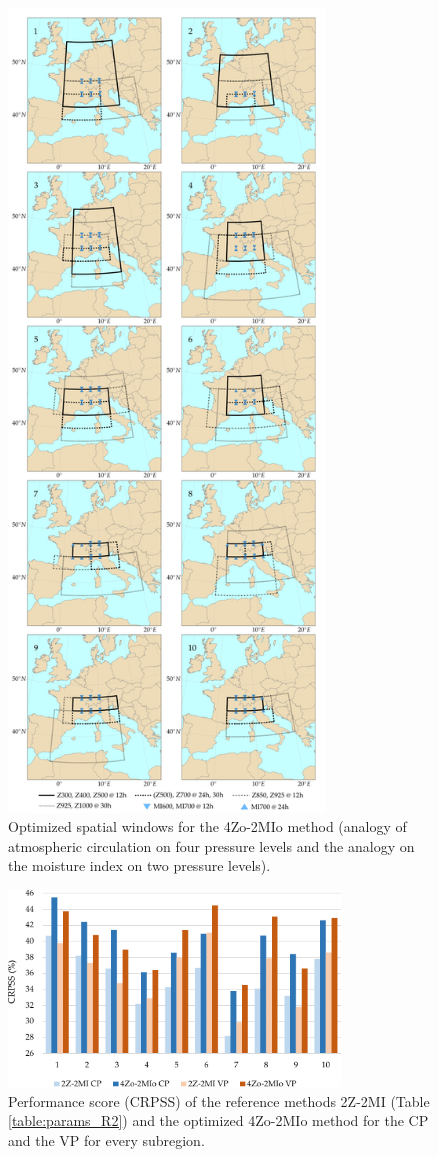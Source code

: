 \documentclass[review]{elsarticle}
\begin{document}
\begin{figure}[t]
	\centerline{\includegraphics[width=8.4cm]{figures/fig06.pdf}}
	\caption{Optimized spatial windows for the 4Zo-2MIo method (analogy of atmospheric circulation on four pressure levels and the analogy on the moisture index on two pressure levels).}
	\label{fig:spatial_windows_4Zo-2MIo}
\end{figure}

\begin{figure}[t]
	\centerline{\includegraphics[width=8.8cm]{figures/fig07.pdf}}
	\caption{Performance score (CRPSS) of the reference methods 2Z-2MI (Table \ref{table:params_R2}) and the optimized 4Zo-2MIo method for the CP and the VP for every subregion.}
	\label{fig:figure_crpss_4Zo-2HIo}
\end{figure}
\end{document}
